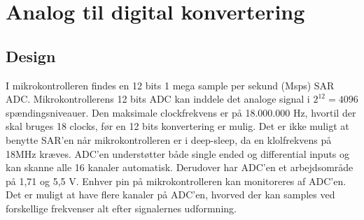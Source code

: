 \section{Analog til digital konvertering}
\subsection{Design}
I mikrokontrolleren findes en 12 bits 1 mega sample per sekund (Msps) SAR ADC. Mikrokontrollerens 12 bits ADC kan inddele det analoge signal i $2^{12} = 4096$ spændingsniveauer. Den maksimale clockfrekvens er på 18.000.000 Hz, hvortil der skal bruges 18 clocks, før en 12 bits konvertering er mulig. Det er ikke muligt at benytte SAR'en når mikrokontrolleren er i deep-sleep, da en klolfrekvens på 18MHz kræves.\newline
ADC'en understøtter både single ended og differential inputs og kan skanne alle 16 kanaler automatisk.  Derudover har ADC'en et arbejdsområde på 1,71 og 5,5 V. Enhver pin på mikrokontrolleren kan monitoreres af ADC'en. Det er muligt at have flere kanaler på ADC'en, hvorved der kan samples ved forskellige frekvenser alt efter signalernes udformning. \citep{Semiconductor20164200M}